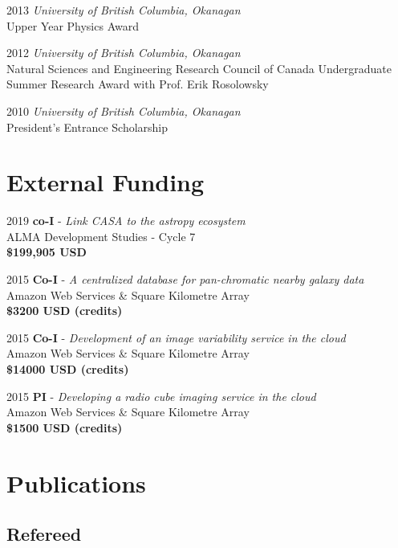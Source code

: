 \documentclass[letterpaper,11pt]{article}
\newlength{\mainindent} \setlength{\mainindent}{12pt}
\newlength{\contentindent} \setlength{\contentindent}{19ex}
\newenvironment{datelist}{
  \begingroup
  \raggedright
  \begin{description}[labelindent=\mainindent,leftmargin=\contentindent,
      style=sameline,font=\normalfont,topsep=0pt,partopsep=0pt,parsep=0pt,
      itemsep=4pt]
}{
  \end{description}
  \endgroup
}
\begin{document}
\begin{datelist}
\item[2013] \emph{University of British Columbia, Okanagan} \\ Upper Year Physics Award
\item[2012] \emph{University of British Columbia, Okanagan} \\ Natural Sciences and Engineering Research Council of Canada Undergraduate Summer Research Award with Prof. Erik Rosolowsky
\item[2010] \emph{University of British Columbia, Okanagan} \\ President's Entrance Scholarship
\end{datelist}



\section*{External Funding}
\begin{datelist}
\item[2019] \textbf{co-I} - \emph{Link CASA to the astropy ecosystem} \\ ALMA Development Studies - Cycle 7 \\ \textbf{\$199,905 USD}
\item[2015] \textbf{Co-I} - \emph{A centralized database for pan-chromatic nearby galaxy data} \\ Amazon Web Services \& Square Kilometre Array \\ \textbf{\$3200 USD (credits)}
\item[2015] \textbf{Co-I} - \emph{Development of an image variability service in the cloud} \\ Amazon Web Services \& Square Kilometre Array \\ \textbf{\$14000 USD (credits)}
\item[2015] \textbf{PI} - \emph{Developing a radio cube imaging service in the cloud} \\ Amazon Web Services \& Square Kilometre Array \\ \textbf{\$1500 USD (credits)}
\end{datelist}



\section*{Publications}

\subsection*{Refereed}
\end{document}
